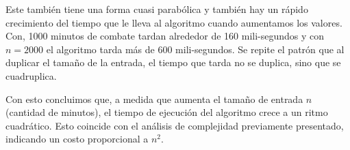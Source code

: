 \documentclass{article}
\begin{document}
Este también tiene una forma cuasi parabólica y también hay un rápido crecimiento del tiempo que le lleva al  algoritmo cuando aumentamos los valores. Con, 1000 minutos de combate tardan alrededor de 160 mili-segundos y con $n = 2000$ el algoritmo tarda más de 600 mili-segundos. Se repite el patrón que al duplicar el tamaño de la entrada, el tiempo que tarda no se duplica, sino que se cuadruplica.

Con esto concluimos que, a medida que aumenta el tamaño de entrada $n$ (cantidad de minutos), el tiempo de ejecución del algoritmo crece a un ritmo cuadrático. Esto coincide con el análisis de complejidad previamente presentado, indicando un costo proporcional a $n^2$.
\end{document}

